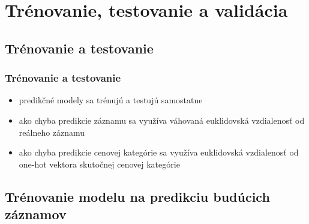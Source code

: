 \documentclass[slovak]{beamer}
\begin{document}
\section{Trénovanie, testovanie a validácia}

\subsection{Trénovanie a testovanie}

\begin{frame}
	\frametitle{Trénovanie a testovanie}
	\begin{itemize}
		\item<1> predikčné modely sa trénujú a testujú samostatne
		\item<1> ako chyba predikcie záznamu sa využíva váhovaná euklidovská vzdialenosť od reálneho záznamu
		\item<1> ako chyba predikcie cenovej kategórie sa využíva euklidovská vzdialenosť od one-hot vektora skutočnej cenovej kategórie
		
	\end{itemize}
\end{frame}

\subsection{Trénovanie modelu na predikciu budúcich záznamov}
\end{document}
